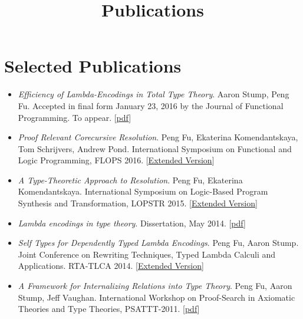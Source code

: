 \documentclass[10pt]{article}
\title{\bfseries\Large Publications}
\date{}
\begin{document}
\maketitle
\vspace{-4em}

\vspace{20pt}





\section*{Selected Publications}

\begin{itemize}
\item \textit{Efficiency of Lambda-Encodings in Total Type Theory}. Aaron Stump, Peng Fu. Accepted in final form January 23, 2016 by the Journal of Functional Programming. To appear.
  [\href{../../document/papers/efficiency.pdf}{pdf}]
  
\item \textit{Proof Relevant Corecursive Resolution}. Peng Fu, Ekaterina Komendantskaya, Tom Schrijvers, Andrew Pond. International Symposium on Functional and Logic Programming, FLOPS 2016. 
  [\href{../../document/papers/corec.pdf}{Extended Version}]
\item \textit{A Type-Theoretic Approach to Resolution}. Peng Fu, Ekaterina Komendantskaya. International Symposium on Logic-Based Program Synthesis and Transformation, LOPSTR 2015. [\href{../../document/papers/tm-lp.pdf}{Extended Version}]

\item \textit{Lambda encodings in type theory}. Dissertation, May 2014. [\href{../../document/papers/dissertation.pdf}{pdf}]

\item \textit{Self Types for Dependently Typed Lambda Encodings}. Peng Fu, Aaron Stump. Joint Conference on Rewriting Techniques, Typed Lambda Calculi and Applications. RTA-TLCA 2014. [\href{../../document/papers/rta-tlca.pdf}{Extended Version}]

\item \textit{A Framework for Internalizing Relations into Type Theory}. Peng Fu, Aaron Stump, Jeff Vaughan. International Workshop on Proof-Search in Axiomatic Theories and Type Theories, PSATTT-2011. [\href{../../document/papers/psattt-paper.pdf}{pdf}]
  
\end{itemize}
\end{document}
